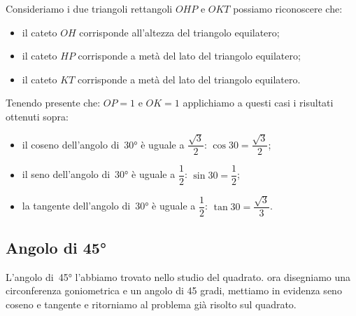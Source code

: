  \begin{minipage}{.45\textwidth}
  \begin{center}
\begin{inaccessibleblock}
    
\end{inaccessibleblock}
  \end{center}
 \end{minipage}
 \begin{minipage}{.45\textwidth}
Consideriamo i due triangoli rettangoli \(OHP\) e \(OKT\) possiamo riconoscere 
che:
\begin{itemize} [noitemsep]
 \item il cateto \(OH\) corrisponde all'altezza del triangolo equilatero; 
 \item il cateto \(HP\) corrisponde a metà del lato del triangolo equilatero;
 \item il cateto \(KT\) corrisponde a metà del lato del triangolo equilatero.\\
\end{itemize}
 \end{minipage}

Tenendo presente che: \(OP=1\) e \(OK=1\) applichiamo a questi casi i risultati 
ottenuti sopra:
\begin{itemize} [noitemsep]
 \item il coseno dell'angolo di~30° è uguale a \(\dfrac{\sqrt{3}}{2}\): 
  \(\cos 30 = \dfrac{\sqrt{3}}{2}\); 
 \item il seno dell'angolo di~30° è uguale a \(\dfrac{1}{2}\): 
  \(\sin 30 = \dfrac{1}{2}\); 
 \item la tangente dell'angolo di~30° è uguale a \(\dfrac{1}{2}\): 
  \(\tan 30 = \dfrac{\sqrt{3}}{3}\).
\end{itemize}

\subsection{Angolo di 45°}

L'angolo di~45° l'abbiamo trovato nello studio del quadrato. ora 
disegniamo una circonferenza goniometrica e un angolo di 45 gradi, mettiamo 
in evidenza seno coseno e tangente e ritorniamo al problema già risolto sul 
quadrato.\\

